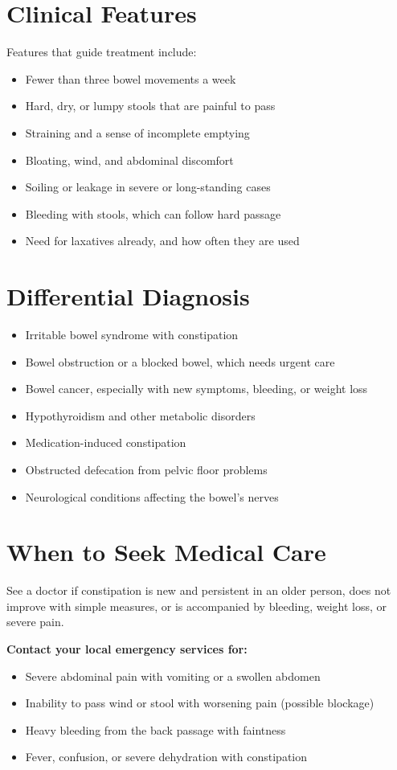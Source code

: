 \section*{Clinical Features}
Features that guide treatment include:
\begin{itemize}
    \item Fewer than three bowel movements a week
    \item Hard, dry, or lumpy stools that are painful to pass
    \item Straining and a sense of incomplete emptying
    \item Bloating, wind, and abdominal discomfort
    \item Soiling or leakage in severe or long-standing cases
    \item Bleeding with stools, which can follow hard passage
    \item Need for laxatives already, and how often they are used
\end{itemize}

\section*{Differential Diagnosis}
\begin{itemize}
    \item Irritable bowel syndrome with constipation
    \item Bowel obstruction or a blocked bowel, which needs urgent care
    \item Bowel cancer, especially with new symptoms, bleeding, or weight loss
    \item Hypothyroidism and other metabolic disorders
    \item Medication-induced constipation
    \item Obstructed defecation from pelvic floor problems
    \item Neurological conditions affecting the bowel's nerves
\end{itemize}

\section*{When to Seek Medical Care}
See a doctor if constipation is new and persistent in an older person, does not improve with simple measures, or is accompanied by bleeding, weight loss, or severe pain.

\textbf{Contact your local emergency services for:}
\begin{itemize}
    \item Severe abdominal pain with vomiting or a swollen abdomen
    \item Inability to pass wind or stool with worsening pain (possible blockage)
    \item Heavy bleeding from the back passage with faintness
    \item Fever, confusion, or severe dehydration with constipation
\end{itemize}


